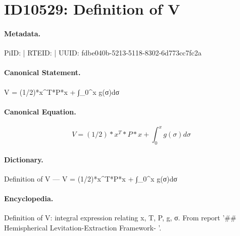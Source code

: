 \section*{ID10529: Definition of V}
\paragraph{Metadata.}
PiID:  | RTEID:  | UUID: fdbe040b-5213-5118-8302-6d773cc7fc2a

\paragraph{Canonical Statement.}
V = (1/2)*x\textasciicircum{}T*P*x + ∫\_0\textasciicircum{}x g(σ)dσ

\paragraph{Canonical Equation.}
\[
V = (1/2)*x^T*P*x + ∫_0^x g(σ)dσ
\]

\paragraph{Dictionary.}
Definition of V — V = (1/2)*x\textasciicircum{}T*P*x + ∫\_0\textasciicircum{}x g(σ)dσ

\paragraph{Encyclopedia.}
Definition of V: integral expression relating x, T, P, g, σ. From report '\#\# Hemispherical Levitation-Extraction Framework- '.
